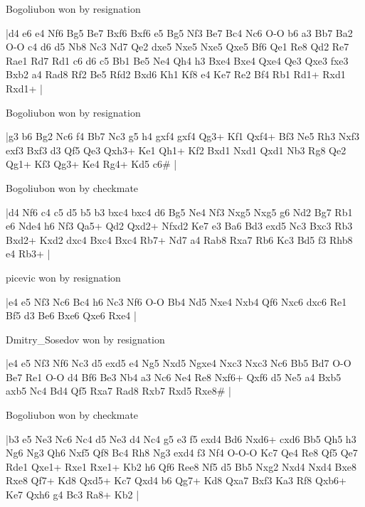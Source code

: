 \showboard

Bogoliubon won by resignation

\makegametitle
|d4 e6 e4 Nf6 Bg5 Be7 Bxf6 Bxf6 e5 Bg5 Nf3 Be7 Bc4 Nc6 O-O b6 a3 Bb7 Ba2 O-O c4 d6 d5 Nb8 Nc3 Nd7 Qe2 dxe5 Nxe5 Nxe5 Qxe5 Bf6 Qe1 Re8 Qd2 Re7 Rae1 Rd7 Rd1 c6 d6 c5 Bb1 Be5 Ne4 Qh4 h3 Bxe4 Bxe4 Qxe4 Qe3 Qxe3 fxe3 Bxb2 a4 Rad8 Rf2 Be5 Rfd2 Bxd6 Kh1 Kf8 e4 Ke7 Re2 Bf4 Rb1 Rd1+ Rxd1 Rxd1+  |

\showboard

Bogoliubon won by resignation

\makegametitle
|g3 b6 Bg2 Nc6 f4 Bb7 Nc3 g5 h4 gxf4 gxf4 Qg3+ Kf1 Qxf4+ Bf3 Ne5 Rh3 Nxf3 exf3 Bxf3 d3 Qf5 Qe3 Qxh3+ Ke1 Qh1+ Kf2 Bxd1 Nxd1 Qxd1 Nb3 Rg8 Qe2 Qg1+ Kf3 Qg3+ Ke4 Rg4+ Kd5 c6\#  |

\showboard

Bogoliubon won by checkmate

\makegametitle
|d4 Nf6 c4 c5 d5 b5 b3 bxc4 bxc4 d6 Bg5 Ne4 Nf3 Nxg5 Nxg5 g6 Nd2 Bg7 Rb1 e6 Nde4 h6 Nf3 Qa5+ Qd2 Qxd2+ Nfxd2 Ke7 e3 Ba6 Bd3 exd5 Nc3 Bxc3 Rb3 Bxd2+ Kxd2 dxc4 Bxc4 Bxc4 Rb7+ Nd7 a4 Rab8 Rxa7 Rb6 Kc3 Bd5 f3 Rhb8 e4 Rb3+  |

\showboard

picevic won by resignation

\makegametitle
|e4 e5 Nf3 Nc6 Bc4 h6 Nc3 Nf6 O-O Bb4 Nd5 Nxe4 Nxb4 Qf6 Nxc6 dxc6 Re1 Bf5 d3 Be6 Bxe6 Qxe6 Rxe4  |

\showboard

Dmitry\_Sosedov won by resignation

\makegametitle
|e4 e5 Nf3 Nf6 Nc3 d5 exd5 e4 Ng5 Nxd5 Ngxe4 Nxc3 Nxc3 Nc6 Bb5 Bd7 O-O Be7 Re1 O-O d4 Bf6 Be3 Nb4 a3 Nc6 Ne4 Re8 Nxf6+ Qxf6 d5 Ne5 a4 Bxb5 axb5 Nc4 Bd4 Qf5 Rxa7 Rad8 Rxb7 Rxd5 Rxe8\#  |

\showboard

Bogoliubon won by checkmate

\makegametitle
|b3 e5 Ne3 Nc6 Nc4 d5 Ne3 d4 Nc4 g5 e3 f5 exd4 Bd6 Nxd6+ cxd6 Bb5 Qh5 h3 Ng6 Ng3 Qh6 Nxf5 Qf8 Bc4 Rh8 Ng3 exd4 f3 Nf4 O-O-O Kc7 Qe4 Re8 Qf5 Qe7 Rde1 Qxe1+ Rxe1 Rxe1+ Kb2 h6 Qf6 Ree8 Nf5 d5 Bb5 Nxg2 Nxd4 Nxd4 Bxe8 Rxe8 Qf7+ Kd8 Qxd5+ Kc7 Qxd4 b6 Qg7+ Kd8 Qxa7 Bxf3 Ka3 Rf8 Qxb6+ Ke7 Qxh6 g4 Bc3 Ra8+ Kb2  |


